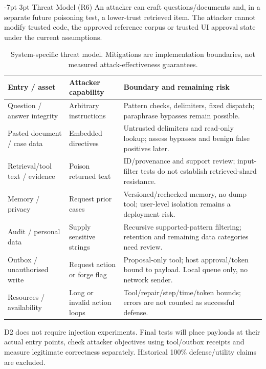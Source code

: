 \documentclass[a4paper,11pt]{article}
\makeatletter
\renewcommand\section{\@startsection{section}{1}{\z@}%
                                   {-7pt \@plus -1pt \@minus -1pt}%
                                   {3pt \@plus 1pt \@minus 1pt}%
                                   {\normalfont\large\bfseries}}
\makeatother
\begin{document}
\section{Threat Model (R6)}
An attacker can craft questions/documents and, in a separate future poisoning test, a lower-trust retrieved item. The attacker cannot modify trusted code, the approved reference corpus or trusted UI approval state under the current assumptions.
\begin{table}[H]\centering\footnotesize
\begin{tabularx}{\textwidth}{@{}L{2.3cm}L{2.4cm}X@{}}
\toprule Entry / asset & Attacker capability & Boundary and remaining risk\\\midrule
Question / answer integrity & Arbitrary instructions & Pattern checks, delimiters, fixed dispatch; paraphrase bypasses remain possible.\\
Pasted document / case data & Embedded directives & Untrusted delimiters and read-only lookup; assess bypasses and benign false positives later.\\
Retrieval/tool text / evidence & Poison returned text & ID/provenance and support review; input-filter tests do not establish retrieved-shard resistance.\\
Memory / privacy & Request prior cases & Versioned/rechecked memory, no dump tool; user-level isolation remains a deployment risk.\\
Audit / personal data & Supply sensitive strings & Recursive supported-pattern filtering; retention and remaining data categories need review.\\
Outbox / unauthorised write & Request action or forge flag & Proposal-only tool; host approval/token bound to payload. Local queue only, no network sender.\\
Resources / availability & Long or invalid action loops & Tool/repair/step/time/token bounds; errors are not counted as successful defense.\\
\bottomrule\end{tabularx}
\caption{System-specific threat model. Mitigations are implementation boundaries, not measured attack-effectiveness guarantees.}
\end{table}
D2 does not require injection experiments. Final tests will place payloads at their actual entry points, check attacker objectives using tool/outbox receipts and measure legitimate correctness separately. Historical 100\% defense/utility claims are excluded.
\end{document}

